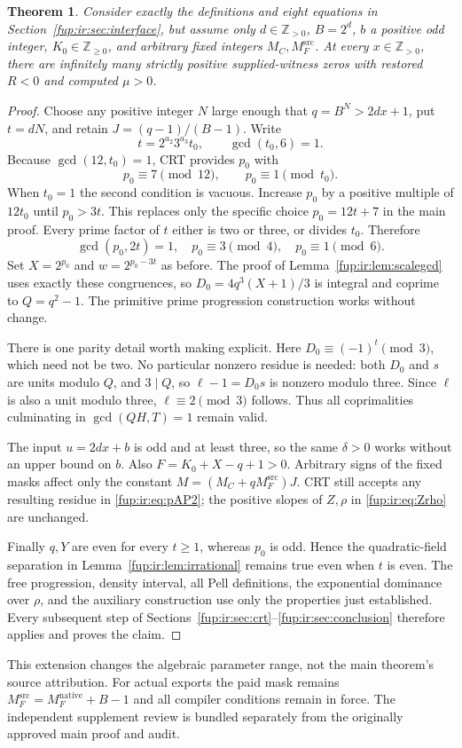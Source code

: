 \documentclass[11pt,letterpaper]{article}
\newtheorem{theorem}{Theorem}[section]
\theoremstyle{definition}\newtheorem{definition}[theorem]{Definition}
\theoremstyle{remark}\newtheorem{remark}[theorem]{Remark}
\newcommand{\Z}{\mathbb Z}\newcommand{\Np}{\mathbb Z_{>0}}
\newcommand{\pos}{\mathbb Z_{>0}}
\newcommand{\MFnat}{M_{F}^{\mathrm{native}}}
\newcommand{\MFsrc}{M_F^{\mathrm{src}}}
\newcommand{\MC}{M_C}
\begin{document}
\begin{theorem}\label{fup:ir:thm:generalized}
Consider exactly the definitions and eight equations in Section~\ref{fup:ir:sec:interface}, but assume only $d\in\pos$, $B=2^d$, $b$ a positive odd integer, $K_0\in\Z_{\ge0}$, and arbitrary fixed integers $\MC,\MFsrc$. At every $x\in\pos$, there are infinitely many strictly positive supplied-witness zeros with restored $R<0$ and computed $\mu>0$.
\end{theorem}
\begin{proof}
Choose any positive integer $N$ large enough that $q=B^N>2dx+1$, put $t=dN$, and retain $J=(q-1)/(B-1)$. Write
\[
 t=2^{a_2}3^{a_3}t_0,\qquad\gcd(t_0,6)=1.
\]
Because $\gcd(12,t_0)=1$, CRT provides $p_0$ with
\[
 p_0\equiv7\pmod{12},\qquad p_0\equiv1\pmod{t_0}.
\]
When $t_0=1$ the second condition is vacuous. Increase $p_0$ by a positive multiple of $12t_0$ until $p_0>3t$. This replaces only the specific choice $p_0=12t+7$ in the main proof. Every prime factor of $t$ either is two or three, or divides $t_0$. Therefore
\[
 \gcd(p_0,2t)=1,\quad p_0\equiv3\pmod4,\quad p_0\equiv1\pmod6.
\]
Set $X=2^{p_0}$ and $w=2^{p_0-3t}$ as before. The proof of Lemma~\ref{fup:ir:lem:scalegcd} uses exactly these congruences, so $D_0=4q^3(X+1)/3$ is integral and coprime to $Q=q^2-1$. The primitive prime progression construction works without change.

There is one parity detail worth making explicit. Here
$D_0\equiv(-1)^t\pmod3$, which need not be two. No particular nonzero residue is needed: both $D_0$ and $s$ are units modulo $Q$, and $3\mid Q$, so $\ell-1=D_0s$ is nonzero modulo three. Since $\ell$ is also a unit modulo three, $\ell\equiv2\pmod3$ follows. Thus all coprimalities culminating in $\gcd(QH,T)=1$ remain valid.

The input $u=2dx+b$ is odd and at least three, so the same $\delta>0$ works without an upper bound on $b$. Also $F=K_0+X-q+1>0$. Arbitrary signs of the fixed masks affect only the constant
$M=(\MC+q\MFsrc)J$. CRT still accepts any resulting residue in \eqref{fup:ir:eq:pAP2}; the positive slopes of $Z,\rho$ in \eqref{fup:ir:eq:Zrho} are unchanged.

Finally $q,Y$ are even for every $t\ge1$, whereas $p_0$ is odd. Hence the quadratic-field separation in Lemma~\ref{fup:ir:lem:irrational} remains true even when $t$ is even. The free progression, density interval, all Pell definitions, the exponential dominance over $\rho$, and the auxiliary construction use only the properties just established. Every subsequent step of Sections~\ref{fup:ir:sec:crt}--\ref{fup:ir:sec:conclusion} therefore applies and proves the claim.
\end{proof}
This extension changes the algebraic parameter range, not the main theorem's source attribution. For actual exports the paid mask remains $\MFsrc=\MFnat+B-1$ and all compiler conditions remain in force. The independent supplement review is bundled separately from the originally approved main proof and audit.
\end{document}
